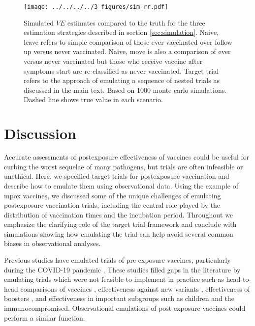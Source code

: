 \documentclass[11pt]{article}
\begin{document}

\begin{figure}[t]
  \centering
  \texttt{[image: ../../../../3\_figures/sim\_rr.pdf]}
  \caption{Simulated $VE$ estimates compared to the truth for the three estimation strategies described in section \ref{sec:simulation}. Naive, leave refers to simple comparison of those ever vaccinated over follow up versus never vaccinated. Naive, move is also a comparison of ever versus never vaccinated but those who receive vaccine after symptoms start are re-classified as never vaccinated. Target trial refers to the approach of emulating a sequence of nested trials as discussed in the main text. Based on 1000 monte carlo simulations. Dashed line shows true value in each scenario. \label{fig:sim_results}}
  \end{figure}

\section{Discussion} \label{sec:discussion}
Accurate assessments of postexposure effectiveness of vaccines could be useful for curbing the worst sequelae of many pathogens, but trials are often infeasible or unethical. Here, we specified target trials for postexposure vaccination and describe how to emulate them using observational data. Using the example of mpox vaccines, we discussed some of the unique challenges of emulating postexposure vaccination trials, including the central role played by the distribution of vaccination times and the incubation period. Throughout we emphasize the clarifying role of the target trial framework and conclude with simulations showing how emulating the trial can help avoid several common biases in observational analyses. 

Previous studies have emulated trials of pre-exposure vaccines, particularly during the COVID-19 pandemic \cite{dagan_bnt162b2_2021,dickerman_comparative_2022,cohen-stavi_bnt162b2_2022,barda_effectiveness_2021}. These studies filled gaps in the literature by emulating trials which were not feasible to implement in practice such as head-to-head comparisons of vaccines \cite{dickerman_comparative_2022}, effectiveness against new variants \cite{cohen-stavi_bnt162b2_2022}, effectiveness of boosters \cite{barda_effectiveness_2021,magen_fourth_2022}, and effectiveness in important subgroups such as children \cite{cohen-stavi_bnt162b2_2022} and the immunocompromised. Observational emulations of post-exposure vaccines could perform a similar function.
 
\end{document}
